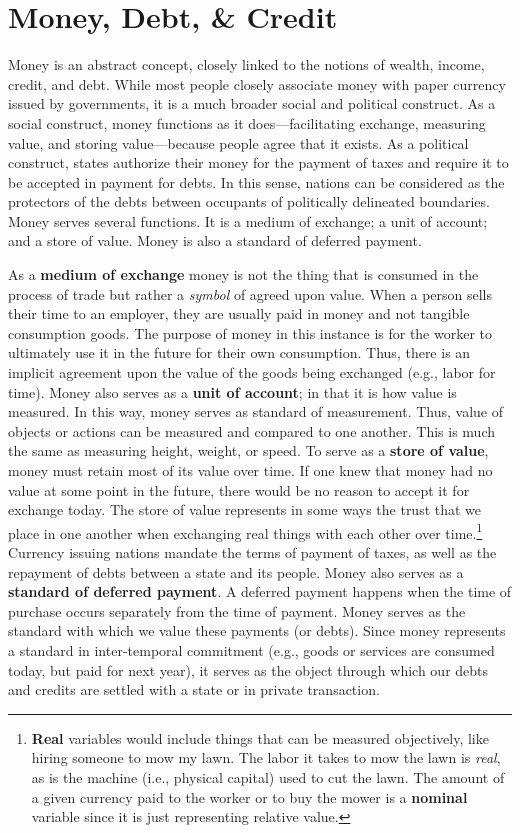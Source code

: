 \documentclass[
]{book}
\begin{document}
\hypertarget{money-debt-credit}{%
\section{Money, Debt, \& Credit}\label{money-debt-credit}}

Money is an abstract concept, closely linked to the notions of wealth, income, credit, and debt. While most people closely associate money with paper currency issued by governments, it is a much broader social and political construct. As a social construct, money functions as it does---facilitating exchange, measuring value, and storing value---because people agree that it exists. As a political construct, states authorize their money for the payment of taxes and require it to be accepted in payment for debts. In this sense, nations can be considered as the protectors of the debts between occupants of politically delineated boundaries. Money serves several functions. It is a medium of exchange; a unit of account; and a store of value. Money is also a standard of deferred payment.

As a \textbf{medium of exchange} money is not the thing that is consumed in the process of trade but rather a \emph{symbol} of agreed upon value. When a person sells their time to an employer, they are usually paid in money and not tangible consumption goods. The purpose of money in this instance is for the worker to ultimately use it in the future for their own consumption. Thus, there is an implicit agreement upon the value of the goods being exchanged (e.g., labor for time). Money also serves as a \textbf{unit of account}; in that it is how value is measured. In this way, money serves as standard of measurement. Thus, value of objects or actions can be measured and compared to one another. This is much the same as measuring height, weight, or speed. To serve as a \textbf{store of value}, money must retain most of its value over time. If one knew that money had no value at some point in the future, there would be no reason to accept it for exchange today. The store of value represents in some ways the trust that we place in one another when exchanging real things with each other over time.\footnote{\textbf{Real} variables would include things that can be measured objectively, like hiring someone to mow my lawn. The labor it takes to mow the lawn is \emph{real}, as is the machine (i.e., physical capital) used to cut the lawn. The amount of a given currency paid to the worker or to buy the mower is a \textbf{nominal} variable since it is just representing relative value.} Currency issuing nations mandate the terms of payment of taxes, as well as the repayment of debts between a state and its people. Money also serves as a \textbf{standard of deferred payment}. A deferred payment happens when the time of purchase occurs separately from the time of payment. Money serves as the standard with which we value these payments (or debts). Since money represents a standard in inter-temporal commitment (e.g., goods or services are consumed today, but paid for next year), it serves as the object through which our debts and credits are settled with a state or in private transaction.
\end{document}
